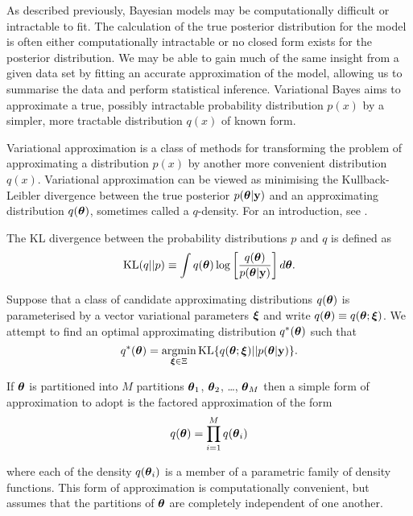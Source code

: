 As described previously, Bayesian models may be computationally difficult or
intractable to fit. The calculation of the true posterior distribution for the
model is often either computationally intractable or no closed form exists for
the posterior distribution. We may be able to gain much of the same insight from
a given data set by fitting an accurate approximation  of the model, allowing us
to summarise the data and perform statistical inference. Variational Bayes aims
to approximate a true, possibly intractable probability distribution $p(x)$ by a
simpler, more tractable distribution $q(x)$ of known form.

Variational approximation is a class of methods for transforming the problem of
approximating a distribution $p(x)$ by another more convenient distribution
$q(x)$. Variational approximation can be viewed as minimising the Kullback-
Leibler divergence between the true posterior $p({\boldsymbol \theta}|{\bf y})$ and an
approximating distribution $q({\boldsymbol \theta})$, sometimes called a $q$-density. For an
introduction, see \cite{Ormerod2010}.


The KL divergence between the probability distributions $p$ and $q$ is defined
as
$$
	\text{KL}(q || p) \equiv \int q({\boldsymbol \theta}) \log \left [ \frac{q({\boldsymbol \theta})}{p({\boldsymbol \theta} | {\bf y})} \right ] d {\boldsymbol \theta}.
$$

Suppose that a class of candidate approximating distributions $q({\boldsymbol \theta})$ is
parameterised by a vector variational parameters ${\boldsymbol \xi}$ and write
$q({\boldsymbol \theta})\equiv q({\boldsymbol \theta};{\boldsymbol \xi})$. We attempt to find an  optimal approximating
distribution $q^*({\boldsymbol \theta})$ such that
$$
	\ds q^*(\vtheta) = \argmin_{\vxi \in \Xi} \text{KL} \{ {q(\vtheta;\vxi) || p(\vtheta|\vy)} \}.
$$

\noindent If ${\boldsymbol \theta}$ is partitioned into $M$ partitions ${\boldsymbol \theta}_1$,
${\boldsymbol \theta}_2$, \ldots, ${\boldsymbol \theta}_M$ then a simple form of approximation to adopt is
the factored approximation of the form
$$
	q({\boldsymbol \theta}) = \prod_{i=1}^M q({\boldsymbol \theta}_i)
$$

\noindent where each of the density $q({\boldsymbol \theta}_i)$ is a member of a parametric
family of density functions.  This form of approximation is computationally
convenient, but assumes that the partitions of ${\boldsymbol \theta}$ are completely
independent of one another.

